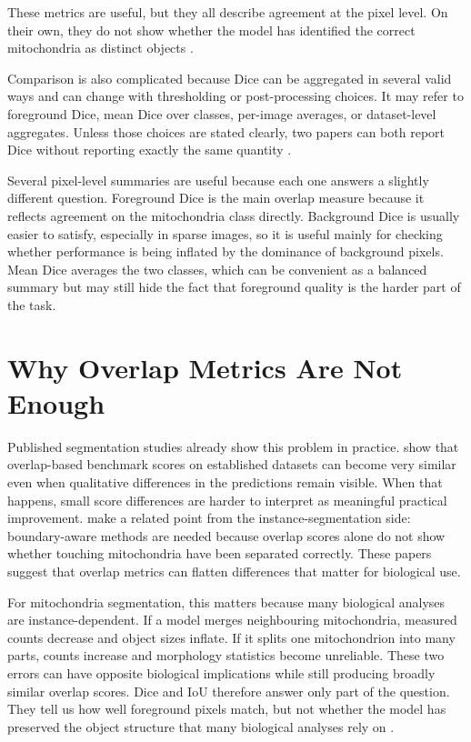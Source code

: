 \documentclass[logo,bsc,singlespacing,parskip,online]{infthesis}
\begin{document}
These metrics are useful, but they all describe agreement at the pixel
level. On their own, they do not show whether the model has identified the
correct mitochondria as distinct objects \citep{wei2020mitoem,
conrad2023instance}.

Comparison is also complicated because Dice can be aggregated in several valid
ways and can change with thresholding or post-processing choices. It may refer
to foreground Dice, mean Dice over classes, per-image averages, or dataset-level
aggregates. Unless those choices are stated clearly, two papers can both report
Dice without reporting exactly the same quantity \citep{taha2015metrics}.

Several pixel-level summaries are useful because each one answers a slightly
different question. Foreground Dice is the main overlap measure because
it reflects agreement on the mitochondria class directly. Background Dice is
usually easier to satisfy, especially in sparse images, so it is useful mainly
for checking whether performance is being inflated by the dominance of
background pixels. Mean Dice averages the two classes, which can be convenient
as a balanced summary but may still hide the fact that foreground quality is
the harder part of the task.

\section{Why Overlap Metrics Are Not Enough}

Published segmentation studies already show this problem in practice. \citet{franco-barranco2022stable}
show that overlap-based benchmark scores on established datasets can become very
similar even when qualitative differences in the predictions remain visible.
When that happens, small score differences are harder to interpret as meaningful
practical improvement. \citet{wei2020mitoem} make a related point from the
instance-segmentation side: boundary-aware methods are needed because overlap
scores alone do not show whether touching mitochondria have been separated
correctly. These papers suggest that overlap metrics can flatten
differences that matter for biological use.

For mitochondria segmentation, this matters because many biological analyses
are instance-dependent. If a model merges neighbouring mitochondria, measured counts
decrease and object sizes inflate. If it splits one mitochondrion into many
parts, counts increase and morphology statistics become unreliable. These two
errors can have opposite biological implications while still producing broadly
similar overlap scores. Dice and IoU therefore answer only part of the question.
They tell us how well foreground pixels match, but not whether the model has
preserved the object structure that many biological analyses rely on \citep{wei2020mitoem,
conrad2023instance}.
\end{document}
